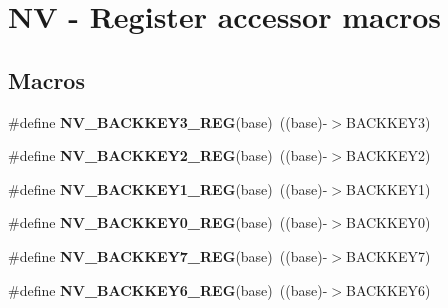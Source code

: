 \hypertarget{group__NV__Register__Accessor__Macros}{}\section{NV -\/ Register accessor macros}
\label{group__NV__Register__Accessor__Macros}
\subsection*{Macros}
\begin{DoxyCompactItemize}
\item 
\#define {\bfseries N\+V\+\_\+\+B\+A\+C\+K\+K\+E\+Y3\+\_\+\+R\+EG}(base)~((base)-\/$>$B\+A\+C\+K\+K\+E\+Y3)\hypertarget{group__NV__Register__Accessor__Macros_gafc7fe743ed5040278c07df44c3679f34}{}\label{group__NV__Register__Accessor__Macros_gafc7fe743ed5040278c07df44c3679f34}

\item 
\#define {\bfseries N\+V\+\_\+\+B\+A\+C\+K\+K\+E\+Y2\+\_\+\+R\+EG}(base)~((base)-\/$>$B\+A\+C\+K\+K\+E\+Y2)\hypertarget{group__NV__Register__Accessor__Macros_gac4ba0b0f5728c1f8cccf007efe73b218}{}\label{group__NV__Register__Accessor__Macros_gac4ba0b0f5728c1f8cccf007efe73b218}

\item 
\#define {\bfseries N\+V\+\_\+\+B\+A\+C\+K\+K\+E\+Y1\+\_\+\+R\+EG}(base)~((base)-\/$>$B\+A\+C\+K\+K\+E\+Y1)\hypertarget{group__NV__Register__Accessor__Macros_ga7d1008712187c004855ee43a54b4e2a6}{}\label{group__NV__Register__Accessor__Macros_ga7d1008712187c004855ee43a54b4e2a6}

\item 
\#define {\bfseries N\+V\+\_\+\+B\+A\+C\+K\+K\+E\+Y0\+\_\+\+R\+EG}(base)~((base)-\/$>$B\+A\+C\+K\+K\+E\+Y0)\hypertarget{group__NV__Register__Accessor__Macros_ga2fb8743f4bd1477b6df6081156659fe4}{}\label{group__NV__Register__Accessor__Macros_ga2fb8743f4bd1477b6df6081156659fe4}

\item 
\#define {\bfseries N\+V\+\_\+\+B\+A\+C\+K\+K\+E\+Y7\+\_\+\+R\+EG}(base)~((base)-\/$>$B\+A\+C\+K\+K\+E\+Y7)\hypertarget{group__NV__Register__Accessor__Macros_ga4e4a56e18420d4898e7f8804b722536e}{}\label{group__NV__Register__Accessor__Macros_ga4e4a56e18420d4898e7f8804b722536e}

\item 
\#define {\bfseries N\+V\+\_\+\+B\+A\+C\+K\+K\+E\+Y6\+\_\+\+R\+EG}(base)~((base)-\/$>$B\+A\+C\+K\+K\+E\+Y6)\hypertarget{group__NV__Register__Accessor__Macros_ga66028631e0b19586c65f3db951474e08}{}\label{group__NV__Register__Accessor__Macros_ga66028631e0b19586c65f3db951474e08}


\end{DoxyCompactItemize}
